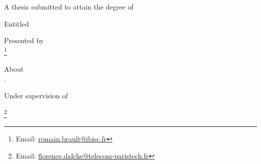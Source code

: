 
\begin{titlepage}

\renewcommand*{\thefootnote}{\fnsymbol{footnote}}
\begin{addmargin}[-1cm]{-3cm}
\begin{center}
\large

\hfill
\vfill

\begingroup
A thesis submitted to attain the degree of \\ \bigskip 
{\Huge \color{Maroon} }
\endgroup

\vfill

\begingroup
Entitled \\ \bigskip
{\Huge \color{Maroon}\spacedallcaps{\myTitle}}
\endgroup

\vfill

Presented by \\ \bigskip 
{\Large\textbf{\spacedlowsmallcaps{\myName}}}\footnote{Email: \href{mailto:romain.brault@ibisc.fr}{romain.brault@ibisc.fr}} %

\vfill

\begingroup
About \\ \bigskip
{\Large \textbf{\spacedlowsmallcaps{\mySubtitle}}}. %
\endgroup

\vfill

\noindent Under supervision of
\par
\mySupervisorDegree \spacedlowsmallcaps{\mySupervisor}\footnote{Email: \href{mailto:florence.dalche@telecom-paristech.fr}{florence.dalche@telecom-paristech.fr}}

\vfill


\end{center}
\end{addmargin}
\end{titlepage}
